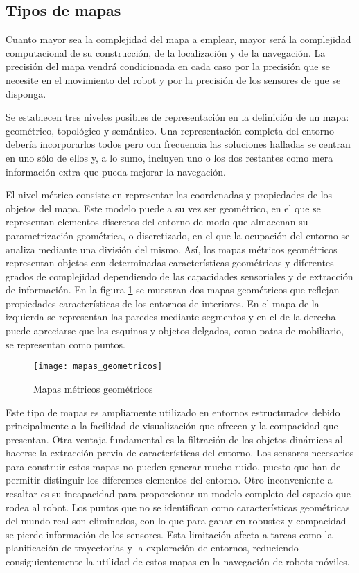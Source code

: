 \subsection{Tipos de mapas}\label{mapas}
Cuanto mayor sea la complejidad del mapa a emplear, mayor será la complejidad computacional de su construcción, de la localización y de la navegación. La precisión del mapa vendrá condicionada en cada caso por la precisión que se necesite en el movimiento del robot y por la precisión de los sensores de que se disponga.

Se establecen tres niveles posibles de representación en la definición de un mapa: geométrico, topológico y semántico. Una representación completa del entorno debería incorporarlos todos pero con frecuencia las soluciones halladas se centran en uno sólo de ellos y, a lo sumo, incluyen uno o los dos restantes como mera información extra que pueda mejorar la navegación.

El nivel métrico consiste en representar las coordenadas y propiedades de los objetos del mapa. Este modelo puede a su vez ser geométrico, en el que se representan elementos discretos del entorno de modo que almacenan su parametrización geométrica, o discretizado, en el que la ocupación del entorno se analiza mediante una división del mismo.
Así, los mapas métricos geométricos representan objetos con determinadas características geométricas y diferentes grados de complejidad dependiendo de las capacidades sensoriales y de extracción de información. En la figura \ref{fg:geometricos} se muestran dos mapas geométricos que reflejan propiedades características de los entornos de interiores. En el mapa de la izquierda se representan las paredes mediante segmentos y en el de la derecha puede apreciarse que las esquinas y objetos delgados, como patas de mobiliario, se representan como puntos.

\begin{figure}[hbt]
  \centering\texttt{[image: mapas\_geometricos]}\\
  \caption{Mapas métricos geométricos}\label{fg:geometricos}
\end{figure}

Este tipo de mapas es ampliamente utilizado en entornos estructurados debido principalmente a la facilidad de visualización que ofrecen y la compacidad que presentan. Otra ventaja fundamental es la filtración de los objetos dinámicos al hacerse la extracción previa de características del entorno. Los sensores necesarios para construir estos mapas no pueden generar mucho ruido, puesto que han de permitir distinguir los diferentes elementos del entorno. Otro inconveniente a resaltar es su incapacidad para proporcionar un modelo completo del espacio que rodea al robot. Los puntos que no se identifican como características geométricas del mundo real son eliminados, con lo que para ganar en robustez y compacidad se pierde información de los sensores. Esta limitación afecta a tareas como la planificación de trayectorias y la exploración de entornos, reduciendo consiguientemente la utilidad de estos mapas en la navegación de robots móviles.

